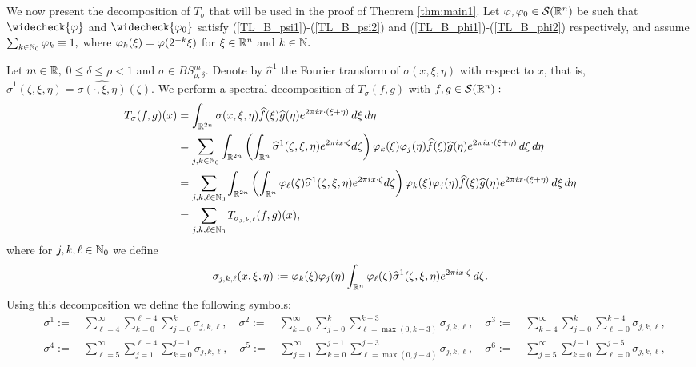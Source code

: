 We now present the decomposition of $T_\sigma$ that will be used in the proof of Theorem \ref{thm:main1}. Let $\varphi,\varphi_0 \in {\mathcal{S}}({{\mathbb R}^n})$ be such that $\widecheck{\varphi}$ and $\widecheck{\varphi_0}$ satisfy (\ref{TL_B_psi1})-(\ref{TL_B_psi2}) and (\ref{TL_B_phi1})-(\ref{TL_B_phi2}) respectively, and assume $\sum_{k \in \mathbb{N}_0} \varphi_k \equiv 1,$ where $\varphi_k(\xi)=\varphi(2^{-k}\xi)$ for $\xi\in{{\mathbb R}^n}$ and $k\in\mathbb{N}.$

Let $m \in \mathbb{R},$ $0 \leq \delta\le \rho < 1$ and $\sigma \in BS^m_{\rho, \delta}.$ Denote by $\widehat{\sigma}^1$ the Fourier transform of $\sigma(x,\xi,\eta)$ with respect to $x$, that is, $\widehat{\sigma}^1(\zeta,\xi,\eta) = \widehat{\sigma(\cdot,\xi,\eta)}(\zeta)$. We perform a spectral decomposition of $T_\sigma(f,g)$ with $f,g\in{\mathcal{S}}({{\mathbb R}^n}):$
\begin{align*}
T_\sigma(f,g)(x)&= \int_{\mathbb{R}^{2n}} \sigma(x, \xi, \eta) \widehat{f}(\xi) \widehat{g}(\eta) e^{2\pi i x \cdot (\xi + \eta)} \, d\xi \, d\eta \\
& =  \sum_{j, k \in \mathbb{N}_0} \int_{\mathbb{R}^{2n}} \left( \int_{{{\mathbb R}^n}} \widehat{\sigma}^1(\zeta, \xi, \eta) e^{2\pi i x \cdot \zeta}  d\zeta \right) \varphi_k(\xi) \varphi_j(\eta) \widehat{f}(\xi) \widehat{g}(\eta) e^{2\pi i x \cdot (\xi + \eta)} \, d\xi \, d\eta\\
& =  \sum_{j,k,\ell\in\mathbb{N}_0} \int_{\mathbb{R}^{2n}} \left( \int_{{{\mathbb R}^n}} \varphi_\ell(\zeta)\widehat{\sigma}^1(\zeta, \xi, \eta) e^{2\pi i x \cdot \zeta}  d\zeta \right) \varphi_k(\xi) \varphi_j(\eta) \widehat{f}(\xi) \widehat{g}(\eta) e^{2\pi i x \cdot (\xi + \eta)} \, d\xi \, d\eta\\
&= \sum_{j,k,\ell\in\mathbb{N}_0}  T_{\sigma_{j,k,\ell}}(f,g)(x),
\end{align*}
where for $j,k, \ell \in \mathbb{N}_0$ we define
\begin{equation*}
\sigma_{j,k,\ell}(x, \xi, \eta):= \varphi_k(\xi) \varphi_j(\eta) \int_{{{\mathbb R}^n}}  \varphi_\ell(\zeta) \widehat{\sigma}^1(\zeta, \xi, \eta) e^{2\pi i x \cdot \zeta}  \, d\zeta.
\end{equation*}	
Using this decomposition we define the following symbols:
\begin{align*}
& \sigma^1:= \quad \sum\limits_{\ell=4}^\infty \sum\limits_{k=0}^{\ell - 4} \sum\limits_{j =0}^{k} \sigma_{j,k,\ell}, \quad \sigma^2:= \quad \sum\limits_{k=0}^\infty \sum\limits_{j=0}^k \sum\limits_{\ell =\max(0,k-3)}^{k+3} \sigma_{j,k,\ell},\quad\sigma^3:= \quad \sum\limits_{k=4}^\infty \sum\limits_{j=0}^k \sum\limits_{\ell =0}^{k-4} \sigma_{j,k,\ell},\\
&\sigma^4:= \quad \sum\limits_{\ell=5}^\infty \sum\limits_{j=1}^{\ell - 4} \sum\limits_{k =0}^{j-1} \sigma_{j,k,\ell}, \quad \sigma^5:= \quad  \sum\limits_{j=1}^\infty \sum\limits_{k=0}^{j-1} \sum\limits_{\ell =\max(0,j-4)}^{j+3} \sigma_{j,k,\ell},\quad \sigma^6:= \quad \sum\limits_{j=5}^\infty \sum\limits_{k=0}^{j-1} \sum\limits_{\ell =0}^{j-5} \sigma_{j,k,\ell},
\end{align*}
